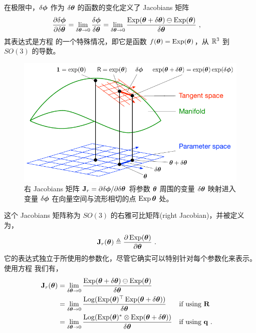 在极限中，$\delta\bfphi$ 作为 $\dth$ 的函数的变化定义了 Jacobians 矩阵
%
\begin{align}
\dpar{\delta\bfphi}{\dth} 
&= \lim_{\dth\to0}\frac{\delta\bfphi}{\dth} 
= \lim_{\dth\to0}\frac{\Exp(\bth+\dth) \ominus \Exp(\bth)}{\dth} 
~,
\end{align}
%
其表达式是方程  的一个特殊情况，即它是函数 $f(\bth)=\Exp(\bth)$，从 $\bbR^3$ 到 $SO(3)$ 的导数。
%
\begin{figure}[tbp]
\begin{center}
\includegraphics{figures/right_jac}
\caption{右 Jacobians 矩阵 $\bfJ_r=\dparil{\delta\bfphi}{\delta\bftheta}$ 将参数 $\bftheta$ 周围的变量 $\delta\bftheta$ 映射进入变量 $\delta\bfphi$ 在向量空间与流形相切的点 $\Exp{\bftheta}$ 处。}
\label{fig:right_jac}
\end{center}
\end{figure}
%
这个 Jacobians 矩阵称为 $SO(3)$ 的右雅可比矩阵(right Jacobian)，并被定义为，
%
\begin{align}
\bfJ_r(\bth) &\te \dpar{\Exp(\bth)}{\bth} 
~.
\end{align}
%
它的表达式独立于所使用的参数化，尽管它确实可以特别针对每个参数化来表示。使用方程  我们有，
%
\begin{align}
\bfJ_r(\bth) &= \lim_{\dth\to0}\frac{\Exp(\bth+\dth)\ominus\Exp(\bth)}{\dth} \\
 &= \lim_{\dth\to0}\frac{\Log(\Exp(\bth)\tr\Exp(\bth+\dth))}{\dth} && \textrm{if using $\bfR$} \\
 &= \lim_{\dth\to0}\frac{\Log(\Exp(\bth)^*\ot\Exp(\bth+\dth))}{\dth} && \textrm{if using $\bfq$} 
 ~.
\end{align}
%

